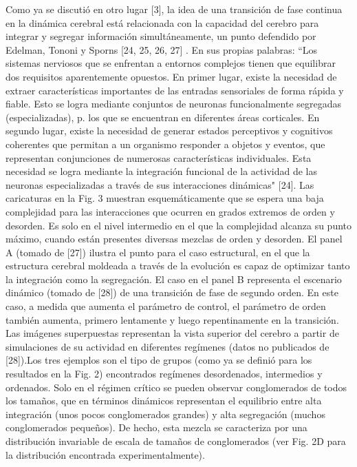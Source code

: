 Como ya se discutió en otro lugar [3], la idea de una transición de fase continua en la dinámica cerebral está relacionada con la capacidad del cerebro para integrar y segregar información simultáneamente, un punto defendido por Edelman, Tononi y Sporns [24, 25, 26, 27] .
En sus propias palabras: “Los sistemas nerviosos que se enfrentan a entornos complejos tienen que equilibrar dos requisitos aparentemente opuestos. En primer lugar, existe la necesidad de extraer características importantes de las entradas sensoriales de forma rápida y fiable. Esto se logra mediante conjuntos de neuronas funcionalmente segregadas (especializadas), p. los que se encuentran en diferentes áreas corticales. En segundo lugar, existe la necesidad de generar estados perceptivos y cognitivos coherentes que permitan a un organismo responder a objetos y eventos, que representan conjunciones de numerosas características individuales. Esta necesidad se logra mediante la integración funcional de la actividad de las neuronas especializadas a través de sus interacciones dinámicas" [24]. Las caricaturas en la Fig. 3 muestran esquemáticamente que se espera una baja complejidad para las interacciones que ocurren en grados extremos de orden y desorden. Es solo en el nivel intermedio en el que la complejidad alcanza su punto máximo, cuando están presentes diversas mezclas de orden y desorden. El panel A (tomado de [27]) ilustra el punto para el caso estructural, en el que la estructura cerebral moldeada a través de la evolución es capaz de optimizar tanto la integración como la segregación. El caso en el panel B representa el escenario dinámico (tomado de [28]) de una transición de fase de segundo orden. En este caso, a medida que aumenta el parámetro de control, el parámetro de orden también aumenta, primero lentamente y luego repentinamente en la transición. Las imágenes superpuestas representan la vista superior del cerebro a partir de simulaciones de su actividad en diferentes regímenes (datos no publicados de [28]).Los tres ejemplos son el tipo de grupos (como ya se definió para los resultados en la Fig. 2) encontrados regímenes desordenados, intermedios y ordenados. Solo en el régimen crítico se pueden observar conglomerados de todos los tamaños, que en términos dinámicos representan el equilibrio entre alta integración (unos pocos conglomerados grandes) y alta segregación (muchos conglomerados pequeños). De hecho, esta mezcla se caracteriza por una distribución invariable de escala de tamaños de conglomerados (ver Fig. 2D para la distribución encontrada experimentalmente).


